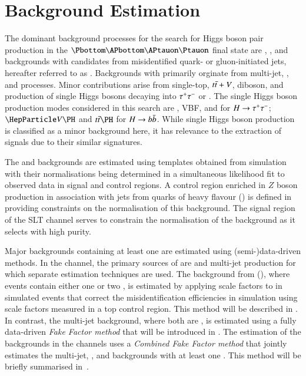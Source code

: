 \section{Background Estimation}
\label{sec:background_estimation}

The dominant background processes for the search for Higgs boson pair
production in the $\bbtautau$ final state are \ttbar, \Zjets, and
backgrounds with \tauhadvis candidates from misidentified quark- or
gluon-initiated jets, hereafter referred to as
\faketauhadvis. Backgrounds with \faketauhadvis primarily orginate
from multi-jet, \Wjets, and \ttbar processes. Minor contributions
arise from single-top, $t\bar{t}+V$, diboson, and production of single
Higgs bosons decaying into $\tau^{+} \tau^{-}$ or \bbbar. The single Higgs boson
production modes considered in this search are \ggF, VBF, \VH and \ttH
for $H \to \tau^{+} \tau^{-}$; $\VH$ and $\ttH$ for $H \to b\bar{b}$. While single
Higgs boson production is classified as a minor background here, it
has relevance to the extraction of \HH signals due to their similar
signatures.

The \Zjets and \ttbar backgrounds are estimated using templates
obtained from simulation with their normalisations being determined in
a simultaneous likelihood fit to observed data in signal and control
regions. A control region enriched in $Z$ boson production in
association with jets from quarks of heavy flavour (\ZHF) is defined
in  providing constraints on the normalisation of
this background. The signal region of the \lephad SLT channel serves
to constrain the normalisation of the \ttbar background as it selects
\ttbar with high purity.

Major backgrounds containing at least one \faketauhad are estimated
using (semi-)data-driven methods. In the \hadhad channel, the primary
sources of \faketauhadvis are \ttbar and multi-jet production for
which separate estimation techniques are used. The \faketauhadvis
background from \ttbar (\ttbarFakes), where events contain either one
or two \faketauhadvis, is estimated by applying scale factors to
\faketauhadvis in simulated \ttbar events that correct the
\jettotauhadvis misidentification efficiencies in simulation using
scale factors measured in a top control region. This method will be
described in . In contrast, the
multi-jet background, where both \tauhadvis are \faketauhadvis, is
estimated using a fully data-driven \emph{Fake Factor method} that
will be introduced in .  The estimation of the
\faketauhadvis backgrounds in the \lephad channels uses a
\emph{Combined Fake Factor method} that jointly estimates the
multi-jet, \Wjets, and \ttbar backgrounds with at least one
\faketauhadvis. This method will be briefly summarised
in~.

